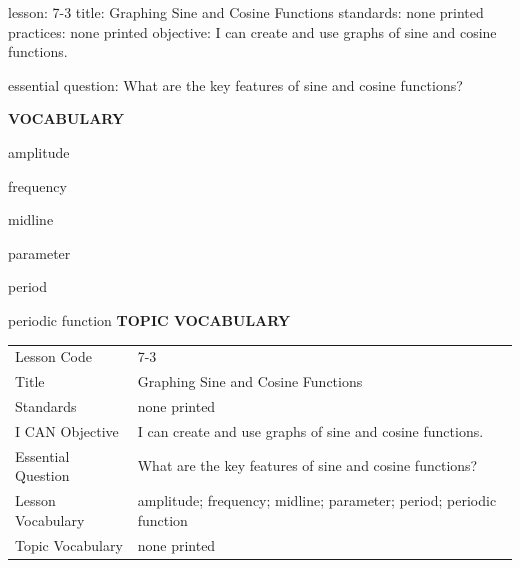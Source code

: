 \documentclass{article}
\newenvironment{lesson-meta}{}{}        %
\newcommand{\te}[1]{}                   %
\begin{document}
\begin{lesson-meta}
lesson: 7-3
title: Graphing Sine and Cosine Functions
standards: none printed
practices: none printed
objective: I can create and use graphs of sine and cosine functions.

essential question: What are the key features of sine and cosine functions?

\textbf{VOCABULARY}
\item amplitude
\item frequency
\item midline
\item parameter
\item period
\item periodic function
\textbf{TOPIC VOCABULARY}
\te{No separate topic vocabulary list is printed on these lesson pages.}
\begin{tabular}{ll}
Lesson Code & 7-3 \\
Title & Graphing Sine and Cosine Functions \\
Standards & none printed \\
I CAN Objective & I can create and use graphs of sine and cosine functions. \\
Essential Question & What are the key features of sine and cosine functions? \\
Lesson Vocabulary & amplitude; frequency; midline; parameter; period; periodic function \\
Topic Vocabulary & none printed \\
\end{tabular}
\end{lesson-meta}
\end{document}
